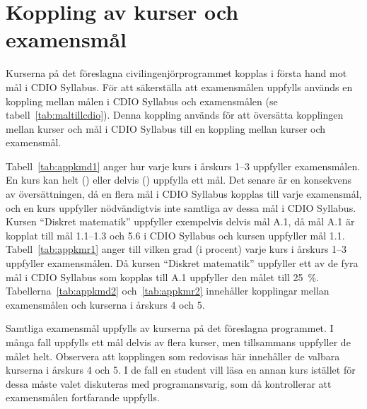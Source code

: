 \chapter{Koppling av kurser och examensmål\label{app:kursmal}}

Kurserna på det föreslagna civilingenjörprogrammet kopplas i första hand mot mål i CDIO Syllabus. För att säkerställa att examensmålen uppfylls används en koppling mellan målen i CDIO Syllabus och examensmålen (se tabell~\ref{tab:maltillcdio}). Denna koppling används för att översätta kopplingen mellan kurser och mål i CDIO Syllabus till en koppling mellan kurser och examensmål. 

Tabell~\ref{tab:appkmd1} anger hur varje kurs i årskurs 1--3 uppfyller examensmålen. En kurs kan helt (\faCircle) eller delvis (\faCircleO) uppfylla ett mål. Det senare är en konsekvens av översättningen, då en flera mål i CDIO Syllabus kopplas till varje examensmål, och en kurs uppfyller nödvändigtvis inte samtliga av dessa mål i CDIO Syllabus. Kursen ``Diskret matematik'' uppfyller exempelvis delvis mål A.1, då mål A.1 är kopplat till mål 1.1--1.3 och 5.6 i CDIO Syllabus och kursen uppfyller mål 1.1. Tabell~\ref{tab:appkmr1} anger till vilken grad (i procent) varje kurs i årskurs 1--3 uppfyller examensmålen. Då kursen ``Diskret matematik'' uppfyller ett av de fyra mål i CDIO Syllabus som kopplas till A.1 uppfyller den målet till 25~\%. Tabellerna~\ref{tab:appkmd2} och~\ref{tab:appkmr2} innehåller kopplingar mellan examensmålen och kurserna i årskurs 4 och 5.

Samtliga examensmål uppfylls av kurserna på det föreslagna programmet. I många fall uppfylls ett mål delvis av flera kurser, men tillsammans uppfyller de målet helt. Observera att kopplingen som redovisas här innehåller de valbara kurserna i årskurs 4 och 5. I de fall en student vill läsa en annan kurs istället för dessa måste valet diskuteras med programansvarig, som då kontrollerar att examensmålen fortfarande uppfylls.

